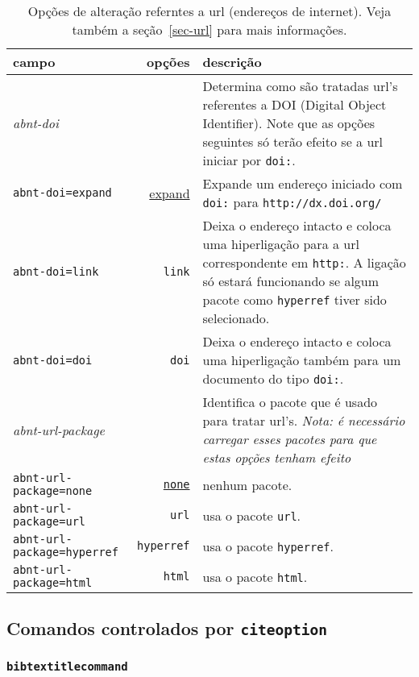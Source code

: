 \documentclass[a4paper]{ltxdoc}
\begin{document}
\begin{table}[htbp]
\begin{center}
\begin{tabular}{lrp{8cm}}\hline\hline
campo & opções & descrição \\ \hline
\emph{abnt-doi} & & Determina como são tratadas url's referentes a DOI
(Digital Object Identifier)\cite{DOI}. Note que as opções seguintes
só terão efeito se a url iniciar por {\tt doi:}.\\
{\tt abnt-doi=expand} & \underline{expand} &
Expande um endereço iniciado com {\tt doi:} para
{\tt http://dx.doi.org/}\\
{\tt abnt-doi=link} & {\tt link} & Deixa o endereço intacto e coloca uma hiperligação
para a url correspondente em {\tt http:}. A ligação só estará funcionando
se algum pacote como {\tt hyperref} tiver sido selecionado.\\
{\tt abnt-doi=doi} & {\tt doi} & Deixa o endereço intacto e coloca uma hiperligação
também para um documento do tipo {\tt doi:}.\\ \hline
\emph{abnt-url-package} & & Identifica o pacote que é usado para tratar url's.
\emph{Nota: é necessário carregar esses pacotes para que estas opções tenham
efeito}\\
{\tt abnt-url-package=none} &\underline{\tt none} & nenhum pacote.\\
{\tt abnt-url-package=url} & {\tt url} & usa o pacote {\tt url}.\\
{\tt abnt-url-package=hyperref} & {\tt hyperref} & usa o pacote {\tt hyperref}.\\
{\tt abnt-url-package=html} & {\tt html} & usa o pacote {\tt html}.\\
\hline\hline
\end{tabular}
\end{center}
\caption[Opções de alteração dos estilos bibliográficos: url]{
Opções de alteração referntes a url (endereços de internet).
Veja também a seção~\protect\ref{sec-url} para mais informações.}
\label{tabela-opcoes-url}
\end{table}

\subsection{Comandos controlados por {\tt citeoption}}

\subsubsection{{\tt bibtextitlecommand}}
\label{sec-titlecommand}
\end{document}
